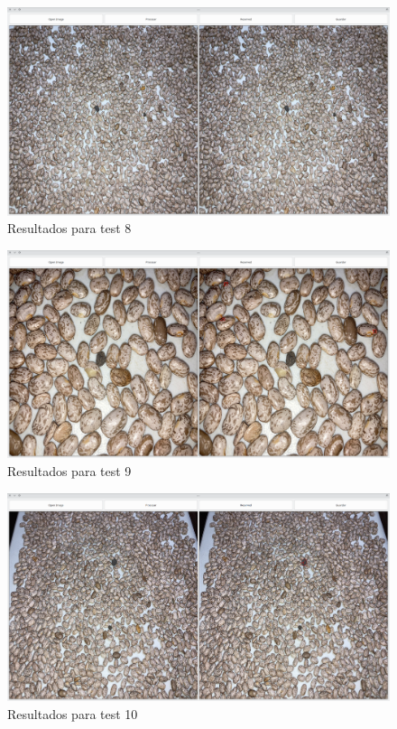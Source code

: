 \documentclass[conference]{IEEEtran}
\begin{document}
        \begin{figure}[H]
            \centering
            \includegraphics[width=\breite\linewidth]{images/test8.png}
            \caption{Resultados para test 8}
            \label{fig:test8}
        \end{figure}

        \begin{figure}[H]
            \centering
            \includegraphics[width=\breite\linewidth]{images/test9.png}
            \caption{Resultados para test 9}
            \label{fig:test9}
        \end{figure}

        \begin{figure}[H]
            \centering
            \includegraphics[width=\breite\linewidth]{images/test10.png}
            \caption{Resultados para test 10}
            \label{fig:test10}
        \end{figure}
\end{document}

